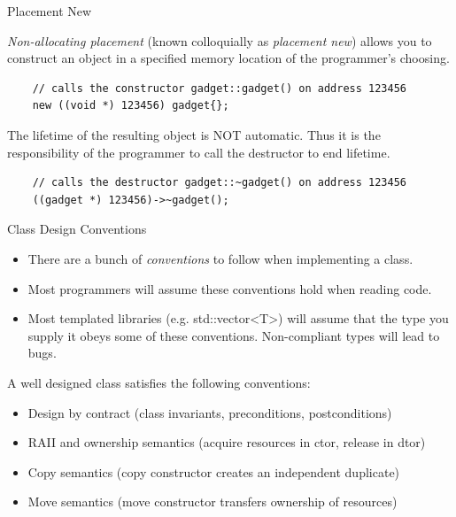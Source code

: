 \begin{frame}[fragile]{Placement New}
  \begin{sqt:definition}
    \emph{Non-allocating placement} (known colloquially as \emph{placement new}) allows
    you to construct an object in a specified memory location of the programmer's choosing.
  \end{sqt:definition}

  \begin{verbatim}
    // calls the constructor gadget::gadget() on address 123456
    new ((void *) 123456) gadget{};
  \end{verbatim}

  The lifetime of the resulting object is NOT automatic.
  Thus it is the responsibility of the programmer to call the destructor to end lifetime.

  \begin{verbatim}
    // calls the destructor gadget::~gadget() on address 123456
    ((gadget *) 123456)->~gadget();
  \end{verbatim}
  
\end{frame}

\begin{frame}[fragile]{Class Design Conventions}
  \begin{itemize}
    \item There are a bunch of \emph{conventions} to follow when implementing a class.
    \item Most programmers will assume these conventions hold when reading code.
    \item Most templated libraries (e.g. std::vector<T>) will assume that the type 
    you supply it obeys some of these conventions. Non-compliant types will lead to bugs.
  \end{itemize}

  A well designed class satisfies the following conventions:
  \begin{itemize}
    \item Design by contract (class invariants, preconditions, postconditions)
    \item RAII and ownership semantics (acquire resources in ctor, release in dtor)
    \item Copy semantics (copy constructor creates an independent duplicate)
    \item Move semantics (move constructor transfers ownership of resources)
  \end{itemize}
\end{frame}


